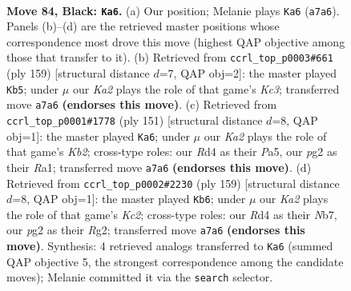 \documentclass[11pt]{article}
\begin{document}
\clearpage

\begin{figure}[p]\centering
\begin{subfigure}{0.46\textwidth}\centering
\resizebox{\linewidth}{!}{%
\newchessgame
\chessboard[
  setfen={8/k7/5K2/1R6/3r4/8/1N4P1/8 b - - 33 84},
  showmover=false,
  pgfstyle=straightmove, color=movearrow, markmove={a7-a6}
]}
\caption{}
\end{subfigure}\hfill
\begin{subfigure}{0.46\textwidth}\centering
\resizebox{\linewidth}{!}{%
\newchessgame
\chessboard[
  setfen={8/R7/2k5/7p/N7/4K3/7r/8 b - - 2 80},
  showmover=false,
  pgfstyle=straightmove, color=movearrow, markmove={c6-b5}
]}
\caption{}
\end{subfigure}
\\[4pt]
\begin{subfigure}{0.46\textwidth}\centering
\resizebox{\linewidth}{!}{%
\newchessgame
\chessboard[
  setfen={8/1k6/8/p7/8/2N4R/5K2/r7 b - - 1 76},
  showmover=false,
  pgfstyle=straightmove, color=movearrow, markmove={b7-a6}
]}
\caption{}
\end{subfigure}\hfill
\begin{subfigure}{0.46\textwidth}\centering
\resizebox{\linewidth}{!}{%
\newchessgame
\chessboard[
  setfen={8/1nk5/8/8/K7/8/6r1/1N1R4 b - - 14 80},
  showmover=false,
  pgfstyle=straightmove, color=movearrow, markmove={c7-b6}
]}
\caption{}
\end{subfigure}
\caption{\textbf{Move 84, Black: \texttt{Ka6}.} (a) Our position; Melanie plays \texttt{Ka6} (\texttt{a7a6}). Panels (b)--(d) are the retrieved master positions whose correspondence most drove this move (highest QAP objective among those that transfer to it). (b) Retrieved from \texttt{ccrl\_top\_p0003\#661} (ply 159) [structural distance $d$=7, QAP obj=2]: the master played \texttt{Kb5}; under $\mu$ our \emph{Ka2} plays the role of that game's \emph{Kc3}; transferred move \texttt{a7a6} \textbf{(endorses this move)}. (c) Retrieved from \texttt{ccrl\_top\_p0001\#1778} (ply 151) [structural distance $d$=8, QAP obj=1]: the master played \texttt{Ka6}; under $\mu$ our \emph{Ka2} plays the role of that game's \emph{Kb2}; cross-type roles: our \emph{R}d4 as their \emph{P}a5, our \emph{p}g2 as their \emph{R}a1; transferred move \texttt{a7a6} \textbf{(endorses this move)}. (d) Retrieved from \texttt{ccrl\_top\_p0002\#2230} (ply 159) [structural distance $d$=8, QAP obj=1]: the master played \texttt{Kb6}; under $\mu$ our \emph{Ka2} plays the role of that game's \emph{Kc2}; cross-type roles: our \emph{R}d4 as their \emph{N}b7, our \emph{p}g2 as their \emph{R}g2; transferred move \texttt{a7a6} \textbf{(endorses this move)}. Synthesis: 4 retrieved analogs transferred to \texttt{Ka6} (summed QAP objective 5, the strongest correspondence among the candidate moves); Melanie committed it via the \texttt{search} selector.}
\label{fig:thought-m167}
\end{figure}
\end{document}
